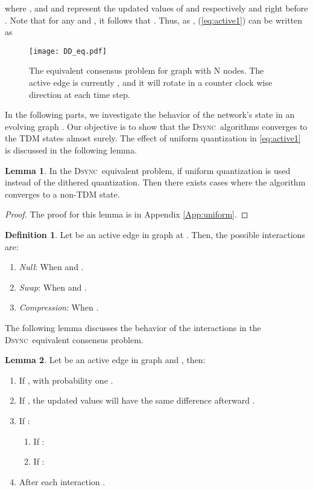 \documentclass[conference]{IEEEtran}
\newcommand{\DDD}{\textsc{Dsync~}}
\theoremstyle{definition}
\theoremstyle{definition}
\newtheorem{lemma}{Lemma}
\newtheorem{definition}{Definition}
\begin{document}
where , and  and  represent the updated values of  and  respectively and right before . Note that for any  and , it follows that . Thus, as , (\ref{eq:active1}) can be written as

\begin{figure}
\centering
\begin{minipage}[b]{0.6\linewidth}
\centerline{\texttt{[image: DD\_eq.pdf]}}
\hfill
\end{minipage}
\vspace{-0.2in}
\caption{The equivalent consensus problem for graph  with N nodes. The active edge is currently , and it will rotate in a counter clock wise direction at each time step.} 
\label{fig:DD_eq}
\end{figure}


In the following parts, we investigate the behavior of the network's state  in an evolving graph . Our objective is to show that the \DDD algorithms converges to the TDM states almost surely. The effect of uniform quantization in \eqref{eq:active1} is discussed in the following lemma.
\begin{lemma}\label{lemma:uniform_q}
In the \DDD equivalent problem, if uniform quantization is used instead of the dithered quantization. Then there exists cases where the algorithm converges to a non-TDM state.
\end{lemma}
\begin{proof}
The proof for this lemma is in Appendix \ref{App:uniform}.
\end{proof}
\begin{definition}
Let  be an active edge in graph  at . Then, the possible interactions are:
\begin{enumerate}
\item \emph{Null}: When  and .
\item \emph{Swap}: When  and .
\item \emph{Compression}: When .   
\end{enumerate}
\end{definition}
The following lemma discusses the behavior of the interactions in the \DDD equivalent consensus problem.
\begin{lemma}\label{lemma:DD_prop}
Let  be an active edge in graph  and , then:
\begin{enumerate}
\item If , with probability one .
\item  If , the updated values will have the same difference afterward .
\item If : 
	\begin{enumerate}
	\item If : 
	
	\item If :
	
	\end{enumerate}
\item After each interaction .
\end{enumerate}
\end{lemma}
\end{document}

